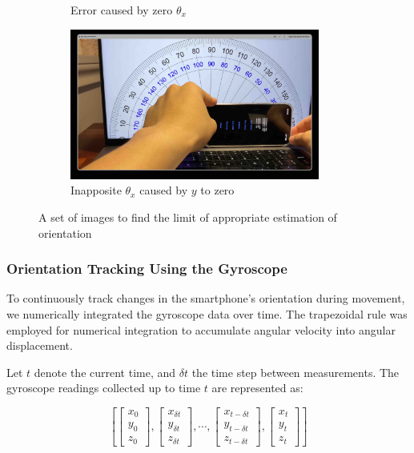 \documentclass{article}
\begin{document}
\begin{figure}[h]
\begin{subfigure}{0.5\textwidth}
        \caption{Error caused by zero $\theta_x$}
        \label{fig:2_1_3_3}
    \end{subfigure}
    \begin{subfigure}{0.5\textwidth}
        \centering
        \includegraphics[width=0.9\textwidth]{Images/2_1_3_4.jpg}
        \caption{Inapposite $\theta_x$ caused by $y$ to zero}
        \label{fig:2_1_3_4}
    \end{subfigure}
    \caption{A set of images to find the limit of appropriate estimation of orientation}
    \label{fig:valid_range_test}
\end{figure}


\subsubsection{Orientation Tracking Using the Gyroscope}

To continuously track changes in the smartphone’s orientation during movement, we numerically integrated the gyroscope data over time. The trapezoidal rule was employed for numerical integration to accumulate angular velocity into angular displacement.

Let $t$ denote the current time, and $\delta t$ the time step between measurements. The gyroscope readings collected up to time $t$ are represented as:

\[
\left[
\begin{bmatrix}x_0\\y_0\\z_0\end{bmatrix},
\begin{bmatrix}x_{\delta t}\\y_{\delta t}\\z_{\delta t} \end{bmatrix},
\cdots,
\begin{bmatrix}x_{t-\delta t}\\y_{t-\delta t}\\z_{t-\delta t} \end{bmatrix},
\begin{bmatrix}x_t\\y_t\\z_t \end{bmatrix}
\right]
\]
\end{document}
